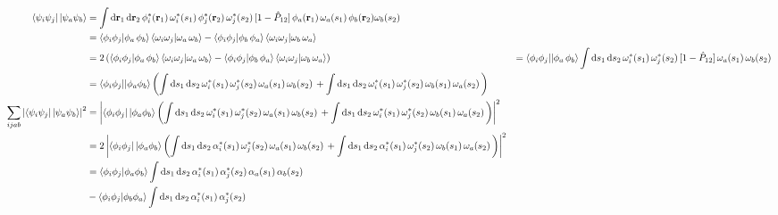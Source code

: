 \documentclass[11pt]{article}
\renewcommand{\a}{\alpha}   %
\newcommand{\f}{\phi}        %
\newcommand{\y}{\ensuremath{\psi}}
\newcommand{\w}{\ensuremath{\omega}}
\newcommand{\mr}[1]{\ensuremath{\mathrm{#1}}}
\newcommand{\bo}[1]{\ensuremath{\mathbf{#1}}}
\theoremstyle{mystyle}
\numberwithin{equation}{section}
\begin{document}
\begin{align*}
   \bra{
      \y_i \y_j
   }
   \ket{
      \y_a \y_b
      }
&=
   \int
   \mr{d} \bo{r}_1 \,
   \mr{d} \bo{r}_2 \,
   \f_i^* (\bo{r}_1) \,
   \w^*_i (s_1) \,
   \f_j^*   (\bo{r}_2) \,
   \w^*_j (s_2) \,
   [
      1 - \hat{P}_{12}
   ] \,
   \f_a   (\bo{r}_1) \,
   \w_a (s_1) \,
   \f_b    (\bo{r}_2) 
   \w_b (s_2) \,
\\
&=
   \braket{ \f_i \f_j | \f_a \, \f_b }
   \braket{ \w_i \w_j | \w_a \, \w_b }
-
   \braket{ \f_i \f_j | \f_b \, \f_a }
   \braket{ \w_i \w_j | \w_b \, \w_a }
\\
&=
   2
   \left(
   \braket{ \f_i \f_j | \f_a \, \f_b }
   \braket{ \w_i \w_j | \w_a \, \w_b }
-
   \braket{ \f_i \f_j | \f_b \, \f_a }
   \braket{ \w_i \w_j | \w_b \, \w_a }
   \right)
&=
    \braket{ \f_i \f_j || \f_a \, \f_b }
    \int
    \mr{d} s_1 \,
   \mr{d} s_2 \,
   \w^*_i (s_1) \,
   \w^*_j (s_2) \,
   [
      1 - \hat{P}_{12}
   ] \,
   \w_a (s_1) \,
   \w_b (s_2) \,
\\
&=
    \braket{ \f_i \f_j || \f_a \f_b }
    \left(
    \int
    \mr{d} s_1 \,
   \mr{d} s_2 \,
   \w^*_i (s_1) \,
   \w^*_j (s_2) \,
   \w_a (s_1) \,
   \w_b (s_2) \,
   +
    \int
    \mr{d} s_1 \,
   \mr{d} s_2 \,
   \w^*_i (s_1) \,
   \w^*_j (s_2) \,
   \w_b (s_1) \,
   \w_a (s_2) \,
   \right)
\\
\sum\limits_{ijab}
   \left|
   \bra{
      \y_i \y_j
   }
   \ket{
      \y_a \y_b
      }
    \right|^2
&=
   \left|
    \bra{
      \f_i \f_j }
   \ket{
      \f_a \f_b }
      \left(
    \int
    \mr{d} s_1 \,
   \mr{d} s_2 \,
   \w^*_i (s_1) \,
   \w^*_j (s_2) \,
   \w_a (s_1) \,
   \w_b (s_2) \,
   +
    \int
    \mr{d} s_1 \,
   \mr{d} s_2 \,
   \w^*_i (s_1) \,
   \w^*_j (s_2) \,
   \w_b (s_1) \,
   \w_a (s_2) \,
   \right)
   \right|^2
\\
&=
   2 
   \left|
    \bra{
      \f_i \f_j }
   \ket{
      \f_a \f_b }
      \left(
    \int
    \mr{d} s_1 \,
   \mr{d} s_2 \,
   \a^*_i (s_1) \,
   \w^*_j (s_2) \,
   \w_a (s_1) \,
   \w_b (s_2) \,
   +
    \int
    \mr{d} s_1 \,
   \mr{d} s_2 \,
   \a^*_i (s_1) \,
   \w^*_j (s_2) \,
   \w_b (s_1) \,
   \w_a (s_2) \,
   \right)
   \right|^2
\\
&=
    \braket{ \f_i \f_j | \f_a \f_b }
    \int
    \mr{d} s_1 \,
    \mr{d} s_2 \,
    \a^*_i (s_1) \,
    \a^*_j (s_2) \,
    \a_a (s_1) \,
    \a_b (s_2) \,
\\
&-
   \braket{ \f_i \f_j | \f_b \f_a }
    \int
    \mr{d} s_1 \,
    \mr{d} s_2 \,
    \a^*_i (s_1) \,
    \a^*_j (s_2) \,

\end{align*}
\end{document}
